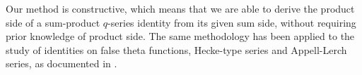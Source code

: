 \documentclass[reqno,12pt]{amsart}
\theoremstyle{remark}
\numberwithin{equation}{section}
\begin{document}

Our method is constructive, which means that we are able to  derive the product side of a sum-product $q$-series identity from its given sum side, without requiring prior knowledge of product side.  The same methodology has been applied  to the  study of identities on false theta functions, Hecke-type series and Appell-Lerch series, as documented in \cite{Wang_Chen,WangChun,Wang,Wang_Yee}.
\end{document}

